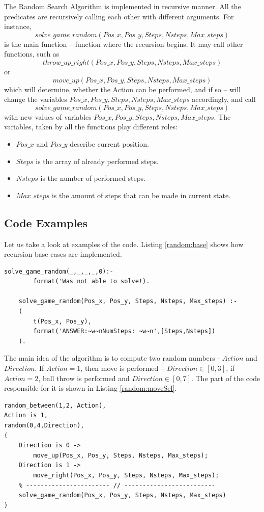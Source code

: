\documentclass[a4apper,11pt]{article}
\begin{document}
The Random Search Algorithm is implemented in recursive manner. All the predicates are recursively calling each other with different arguments. For instance, \[solve\_game\_random(Pos\_x, Pos\_y, Steps, Nsteps, Max\_steps)\]is the main function -- function where the recursion begins. It may call other functions, such as \[throw\_up\_right(Pos\_x, Pos\_y, Steps, Nsteps, Max\_steps)\] or \[move\_up(Pos\_x, Pos\_y, Steps, Nsteps, Max\_steps)\] which will determine, whether the Action can be performed, and if so -- will change the variables $Pos\_x, Pos\_y, Steps, Nsteps, Max\_steps$ accordingly, and call \[solve\_game\_random(Pos\_x, Pos\_y, Steps, Nsteps, Max\_steps)\] with new values of variables $Pos\_x, Pos\_y, Steps, Nsteps, Max\_steps$.
The variables, taken by all the functions play different roles:
\begin{itemize}
    \item $Pos\_x$ and $Pos\_y$ describe current position.
    \item $Steps$ is the array of already performed steps.
    \item $Nsteps$ is the number of performed steps.
    \item $Max\_steps$ is the amount of steps that can be made in current state.
\end{itemize}

\subsection{Code Examples}
Let us take a look at examples of the code. Listing \ref{random:base} shows how recursion base cases are implemented.

\begin{lstlisting}[caption={Recursion Base Cases.}, label={random:base}]
    solve_game_random(_,_,_,_,0):-
        format('Was not able to solve!).
    
    solve_game_random(Pos_x, Pos_y, Steps, Nsteps, Max_steps) :- 
    (
        t(Pos_x, Pos_y),
        format('ANSWER:~w~nNumSteps: ~w~n',[Steps,Nsteps])
    ).
\end{lstlisting}

The main idea of the algorithm is to compute two random numbers - $Action$ and $Direction$. If $Action = 1$, then move is performed -- $Direction \in [0,3]$, if $Action = 2$, ball throw is performed and $Direction \in [0,7]$. The part of the code responsible for it is shown in Listing \ref{random:moveSel}.

\begin{lstlisting}[caption={Recursion Move Selection.}, label={random:moveSel}]
random_between(1,2, Action), 
Action is 1,
random(0,4,Direction),
(
    Direction is 0 -> 
        move_up(Pos_x, Pos_y, Steps, Nsteps, Max_steps);
    Direction is 1 -> 
        move_right(Pos_x, Pos_y, Steps, Nsteps, Max_steps);
    % ----------------------- // -------------------------
    solve_game_random(Pos_x, Pos_y, Steps, Nsteps, Max_steps)
)
\end{lstlisting}
\end{document}
